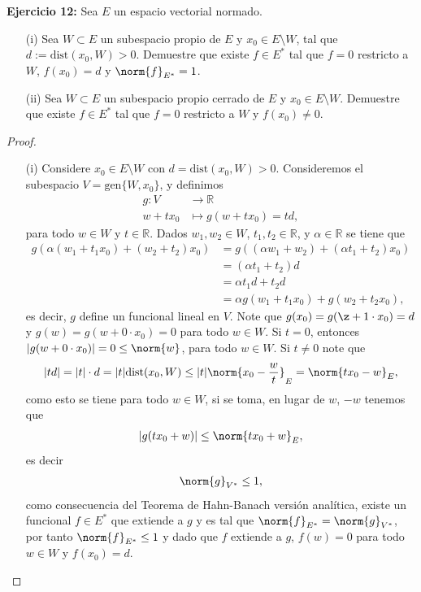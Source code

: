 \textbf{Ejercicio 12:} Sea $E$ un espacio vectorial normado.
\begin{itemize}
    \item[(i)] Sea $W\subset E$ un subespacio propio de $E$ y $x_0\in E\setminus W$, tal que $d:=\text{dist}(x_0,W)>0$. Demuestre que existe $f\in E^*$ tal que $f=0$ restricto a $W$, $f(x_0)=d$ y $\norm{f}_{E^*}=1$.
    \item[(ii)] Sea $W\subset E$ un subespacio propio cerrado de $E$ y $x_0\in E\setminus W$. Demuestre que existe $f\in E^*$ tal que $f=0$ restricto a $W$ y $f(x_0)\neq 0.$ 
\end{itemize}
\begin{proof}
    \begin{enumerate}
        \item[(i)] Considere $x_0 \in E\setminus W$ con $d=\text{dist}(x_0,W)>0$. Consideremos el subespacio $V=\text{gen}\{W,x_0\}$, y definimos 
        \begin{align*}
            g:V &\longrightarrow \mathbb{R}\\
            w+tx_0 &\longmapsto g(w+tx_0)=td,
        \end{align*}
        para todo $w \in W$ y $t \in \mathbb{R}$. Dados $w_1,w_2 \in W$, $t_1,t_2\in \mathbb{R}$, y $\alpha\in \mathbb{R}$ se tiene que
        \begin{align*}
            g(\alpha(w_1+t_1x_0)+(w_2+t_2)x_0)&=g((\alpha w_1+w_2)+(\alpha t_1+t_2)x_0)\\
            &=(\alpha t_1+t_2)d\\
            &=\alpha t_1 d+t_2d\\
            &=\alpha g(w_1+t_1x_0)+g(w_2+t_2x_0),
        \end{align*}
        es decir, $g$ define un funcional lineal en $V$. Note que $g(x_0)=g(\z+1\cdot x_0)=d$ y $g(w)=g(w+0\cdot x_0)=0$ para todo $w \in W$. Si $t=0$, entonces $|g(w+0\cdot x_0)|=0\leq \norm{w}$, para todo $w\in W$. Si $t \neq 0$ note que
        \begin{align*}
            |td|=|t|\cdot d=|t|\text{dist}(x_0,W)\leq |t|\norm{x_0-\frac{w}{t}}_E=\norm{tx_0-w}_E,
        \end{align*}
        como esto se tiene para todo $w\in W$, si se toma, en lugar de $w$, $-w$ tenemos que
        \begin{align*}
            |g(tx_0+w)|\leq \norm{tx_0+w}_E,
        \end{align*}
        es decir
        \begin{align*}
            \norm{g}_{V^*}\leq 1,
        \end{align*}
        como consecuencia del Teorema de Hahn-Banach versión analítica, existe un funcional $f\in E^*$ que extiende a $g$ y es tal que $\norm{f}_{E^*}= \norm{g}_{V^*}$, por tanto $\norm{f}_{E^*}\leq 1$ y dado que $f$ extiende a $g$, $f(w)=0$ para todo $w \in W$ y $f(x_0)=d$. 
        

\end{enumerate}
\end{proof}
